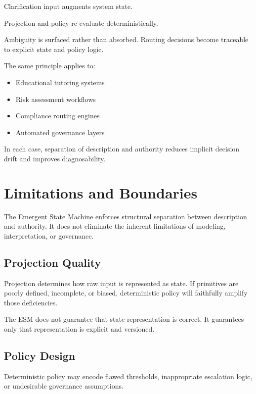 \documentclass[11pt]{article}
\begin{document}
Clarification input augments system state.

Projection and policy re-evaluate deterministically.

Ambiguity is surfaced rather than absorbed. Routing decisions become traceable to explicit state and policy logic.

The same principle applies to:

\begin{itemize}
  \item Educational tutoring systems
  \item Risk assessment workflows
  \item Compliance routing engines
  \item Automated governance layers
\end{itemize}

In each case, separation of description and authority reduces implicit decision drift and improves diagnosability.


\section{Limitations and Boundaries}

The Emergent State Machine enforces structural separation between description and authority. It does not eliminate the inherent limitations of modeling, interpretation, or governance.

\subsection{Projection Quality}

Projection determines how raw input is represented as state. If primitives are poorly defined, incomplete, or biased, deterministic policy will faithfully amplify those deficiencies.

The ESM does not guarantee that state representation is correct. It guarantees only that representation is explicit and versioned.

\subsection{Policy Design}

Deterministic policy may encode flawed thresholds, inappropriate escalation logic, or undesirable governance assumptions.
\end{document}

